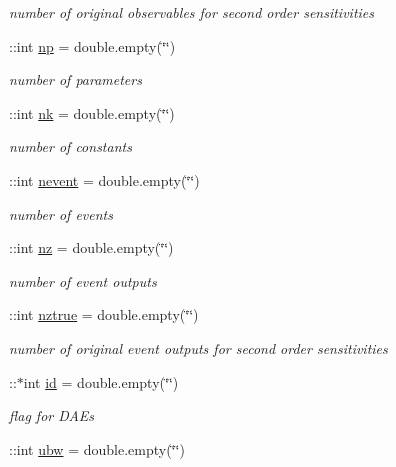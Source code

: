 \begin{DoxyCompactItemize}
\begin{DoxyCompactList}\small\item\em number of original observables for second order sensitivities \end{DoxyCompactList}\item 
\+::int \hyperlink{classamimodel_a6f6e2fe71b05c4c2f2d967ce9ca02dfd}{np} = double.\+empty(\char`\"{}\char`\"{})
\begin{DoxyCompactList}\small\item\em number of parameters \end{DoxyCompactList}\item 
\+::int \hyperlink{classamimodel_afd6bea572754e0c3c320664bdccf0200}{nk} = double.\+empty(\char`\"{}\char`\"{})
\begin{DoxyCompactList}\small\item\em number of constants \end{DoxyCompactList}\item 
\+::int \hyperlink{classamimodel_aab5c7f06273122b68624eb3bca6a9b6e}{nevent} = double.\+empty(\char`\"{}\char`\"{})
\begin{DoxyCompactList}\small\item\em number of events \end{DoxyCompactList}\item 
\+::int \hyperlink{classamimodel_a79f11413e5bfe18a0e71e17574399ad5}{nz} = double.\+empty(\char`\"{}\char`\"{})
\begin{DoxyCompactList}\small\item\em number of event outputs \end{DoxyCompactList}\item 
\+::int \hyperlink{classamimodel_a364ecd990baeeefd1de3e6795cd50a58}{nztrue} = double.\+empty(\char`\"{}\char`\"{})
\begin{DoxyCompactList}\small\item\em number of original event outputs for second order sensitivities \end{DoxyCompactList}\item 
\+::$\ast$int \hyperlink{classamimodel_acf2488b95c97e0378c9bf49de3b50f28}{id} = double.\+empty(\char`\"{}\char`\"{})
\begin{DoxyCompactList}\small\item\em flag for D\+A\+Es \end{DoxyCompactList}\item 
\+::int \hyperlink{classamimodel_a955c9d10635afed4ebc04c60010e5d40}{ubw} = double.\+empty(\char`\"{}\char`\"{})

\end{DoxyCompactItemize}
